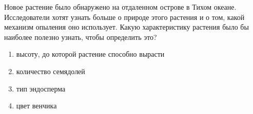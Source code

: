 
Новое растение было обнаружено на
отдаленном острове в Тихом океане. Исследователи хотят узнать больше о природе
этого растения и о том, какой механизм опыления оно использует. Какую
характеристику растения было бы наиболее полезно узнать, чтобы определить это?

\begin{enumerate}
    \item высоту, до которой растение способно вырасти 
    \item количество семядолей   
    \item тип эндосперма  
    \item цвет венчика
\end{enumerate}

